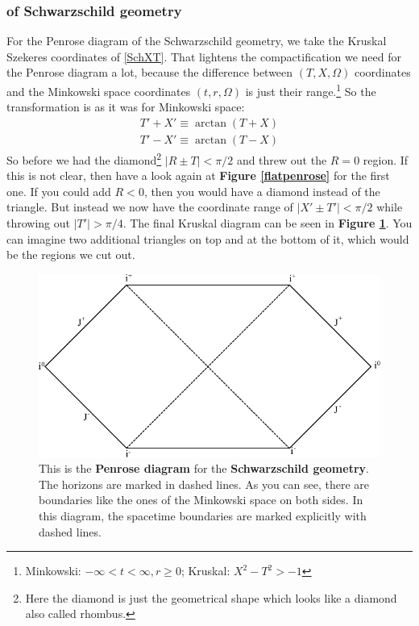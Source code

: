 	\subsubsection{of Schwarzschild geometry \checkmark}
	
	For the Penrose diagram of the Schwarzschild geometry, we take the Kruskal Szekeres coordinates of \eqref{SchXT}. That lightens the compactification we need for the Penrose diagram a lot, because the difference between $(T,X,\Omega)$ coordinates and the Minkowski space coordinates $(t,r,\Omega)$ is just their range.\footnote{Minkowski: $-\infty < t < \infty, r\geq 0$; Kruskal: $X^2-T^2 > -1$}
	So the transformation is as it was for Minkowski space:
		\begin{equation}
			\begin{split}
			T'+X'\equiv \arctan(T+X) \\
			T'-X'\equiv \arctan(T-X)
			\end{split}		
		\end{equation}
	So before we had the diamond\footnote{Here the diamond is just the geometrical shape which looks like a diamond also called rhombus.} $|R \pm T| < \pi/2$ and threw out the $R=0$ region. If this is not clear, then have a look again at \textbf{Figure \ref{flatpenrose}} for the first one. If you could add $R<0$, then you would have a diamond instead of the triangle. But instead we now have the coordinate range of $|X'\pm T'|< \pi/2$ while throwing out $|T'| > \pi/4$. The final Kruskal diagram can be seen in \textbf{Figure \ref{schpenrose}}. You can imagine two additional triangles on top and at the bottom of it, which would be the regions we cut out.
	
		\begin{figure}[tbp]  	
	  	\begin{center}
		\includegraphics[scale=1]{schpenrose}
		\end{center}
		\caption{This is the \textbf{Penrose diagram} for the \textbf{Schwarzschild geometry}. The horizons are marked in dashed lines. As you can see, there are boundaries like the ones of the Minkowski space on both sides. In this diagram, the spacetime boundaries are marked explicitly with dashed lines. } \label{schpenrose}
		\end{figure}
	\FloatBarrier

